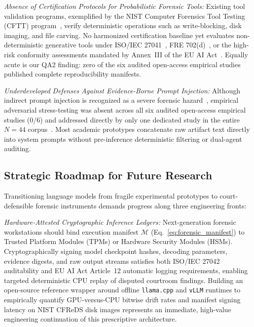 \textit{Absence of Certification Protocols for Probabilistic Forensic Tools:} Existing tool validation programs, exemplified by the NIST Computer Forensics Tool Testing (CFTT) program~\cite{nist_cftt}, verify deterministic operations such as write-blocking, disk imaging, and file carving. No harmonized certification baseline yet evaluates non-deterministic generative tools under ISO/IEC 27041~\cite{iso27041_2015}, FRE 702(d)~\cite{fre702_2023}, or the high-risk conformity assessments mandated by Annex~III of the EU AI Act~\cite{eu_ai_act_2024, scanlon2026_investigation, studiawan2025_towards, tiwari2026_xforensicnet}. Equally acute is our QA2 finding: zero of the six audited open-access empirical studies published complete reproducibility manifests.

\textit{Underdeveloped Defenses Against Evidence-Borne Prompt Injection:} Although indirect prompt injection is recognized as a severe forensic hazard~\cite{chernyshev2026_large, kim2026_evidenceborne}, empirical adversarial stress-testing was absent across all six audited open-access empirical studies (0/6) and addressed directly by only one dedicated study in the entire $N=44$ corpus~\cite{kim2026_evidenceborne}. Most academic prototypes concatenate raw artifact text directly into system prompts without pre-inference deterministic filtering or dual-agent auditing.

\subsection{Strategic Roadmap for Future Research}
Transitioning language models from fragile experimental prototypes to court-defensible forensic instruments demands progress along three engineering fronts:

\textit{Hardware-Attested Cryptographic Inference Ledgers:} Next-generation forensic workstations should bind execution manifest $\mathcal{M}$ (Eq.~\eqref{eq:forensic_manifest}) to Trusted Platform Modules (TPMs) or Hardware Security Modules (HSMs). Cryptographically signing model checkpoint hashes, decoding parameters, evidence digests, and raw output streams satisfies both ISO/IEC 27042 auditability and EU AI Act Article~12 automatic logging requirements, enabling targeted deterministic CPU replay of disputed courtroom findings. Building an open-source reference wrapper around offline \texttt{llama.cpp} and \texttt{vLLM} runtimes to empirically quantify GPU-versus-CPU bitwise drift rates and manifest signing latency on NIST CFReDS disk images represents an immediate, high-value engineering continuation of this prescriptive architecture.


